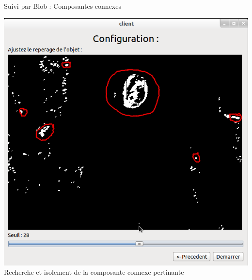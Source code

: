 \documentclass{beamer}
\begin{document}
            \begin{frame}{Suivi par Blob : Composantes connexes}
                  \begin{center}
                        \includegraphics[scale=0.25]{Capture5.png}\\
                        Recherche et isolement de la composante connexe pertinante
                  \end{center}
            \end{frame}
\end{document}
